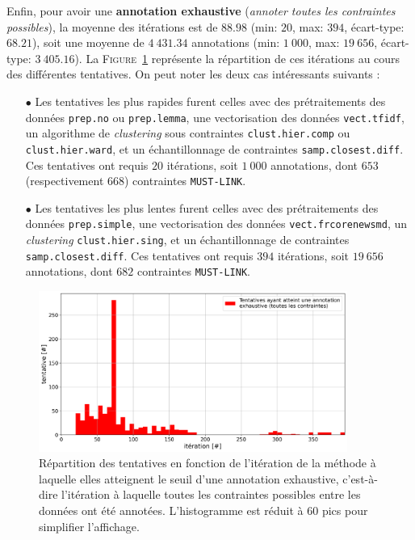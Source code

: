 			Enfin, pour avoir une \textbf{annotation exhaustive} (\textit{annoter toutes les contraintes possibles}), la moyenne des itérations est de $88.98$ (min: $20$, max: $394$, écart-type: $68.21$), soit une moyenne de $4~431.34$ annotations (min: $1~000$, max: $19~656$, écart-type: $3~405.16$).
			La \textsc{Figure~\ref{figure:4.2.1-ETUDE-OPTIMISATION-HISTOGRAMME-ANNOTATION-EXHAUSTIVE}} représente la répartition de ces itérations au cours des différentes tentatives.
			On peut noter les deux cas intéressants suivants :
			\begin{itemize}
				\item[$\bullet$] Les tentatives les plus rapides furent celles avec des prétraitements des données \texttt{prep.no} ou \texttt{prep.lemma}, une vectorisation des données \texttt{vect.tfidf}, un algorithme de \textit{clustering} sous contraintes \texttt{clust.hier.comp} ou \texttt{clust.hier.ward}, et un échantillonnage de contraintes \texttt{samp.closest.diff}.
				Ces tentatives ont requis $20$ itérations, soit $1~000$ annotations, dont $653$ (respectivement $668$) contraintes \texttt{MUST-LINK}.
				\item[$\bullet$] Les tentatives les plus lentes furent celles avec des prétraitements des données \texttt{prep.simple}, une vectorisation des données \texttt{vect.frcorenewsmd}, un \textit{clustering} \texttt{clust.hier.sing}, et un échantillonnage de contraintes \texttt{samp.closest.diff}.
				Ces tentatives ont requis $394$ itérations, soit $19~656$ annotations, dont $682$ contraintes \texttt{MUST-LINK}.
			\end{itemize}
			\begin{figure}[!htb]
				\centering
				\includegraphics[width=0.90\textwidth]{figures/etude-efficience-histogramme-annotation-exhaustive}
				\caption{
					Répartition des tentatives en fonction de l'itération de la méthode à laquelle elles atteignent le seuil d'une annotation exhaustive, c'est-à-dire l'itération à laquelle toutes les contraintes possibles entre les données ont été annotées.
					L'histogramme est réduit à $60$ pics pour simplifier l'affichage.
				}
				\label{figure:4.2.1-ETUDE-OPTIMISATION-HISTOGRAMME-ANNOTATION-EXHAUSTIVE}
			\end{figure}
